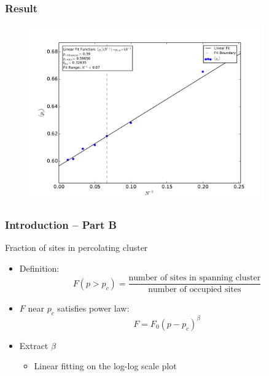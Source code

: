 \documentclass[mathserif,18pt,xcolor=table]{beamer}
\begin{document}
\begin{frame}
	\frametitle{Result}
	\begin{figure}
  	\centering
  	\includegraphics[width=0.9\textwidth]{../output/plots_for_paper/pc_ave_vs_InverseN.pdf}
	\end{figure}
\end{frame}


\begin{frame}
	\frametitle{Introduction -- Part B}
	Fraction of sites in percolating cluster
	\begin{itemize}
		\item Definition:
			\begin{equation}
			F(p>p_c)=\frac{\text{number of sites in spanning cluster}}{\text{number of occupied sites}}
			\end{equation}
		\item $F$ near $p_c$ satisfies power law:
			\begin{equation}
			F=F_0(p-p_c)^\beta
			\end{equation}
		\item Extract $\beta$
			\begin{itemize}
				\item Linear fitting on the log-log scale plot
			\end{itemize}
	\end{itemize}
\end{frame}
\end{document}
